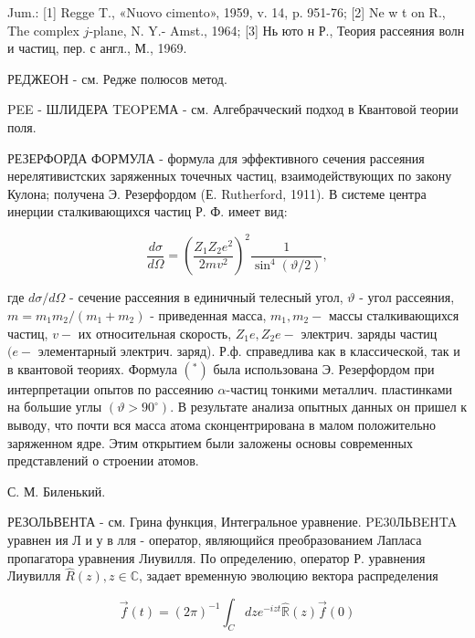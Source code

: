\documentclass[10pt]{article}
\begin{document}
Jum.: [1] Regge T., «Nuovo cimento», 1959, v. 14, p. 951-76; [2] Ne w t on R., The complex $j$-plane, N. Y.- Amst., 1964; [3] Нь юто н Р., Теория рассеяния волн и частиц, пер. с англ., М., 1969.



РЕДЖЕОН - см. Редже полюсов метод.



PEE - ШЛИДЕРА TEOPEМА - см. Алгебрачческий подход в Квантовой теории поля.



РЕЗЕРФОРДА ФОРМУЛА - формула для эффективного сечения рассеяния нерелятивистских заряженных точечных частиц, взаимодействующих по закону Кулона; получена Э. Резерфордом (Е. Rutherford, 1911). В системе центра инерции сталкивающихся частиц Р. Ф. имеет вид:



\[

\frac{d \sigma}{d \Omega}=\left(\frac{Z_{1} Z_{2} e^{2}}{2 m v^{2}}\right)^{2} \frac{1}{\sin ^{4}(\vartheta / 2)},

\]



где $d \sigma / d \Omega$ - сечение рассеяния в единичный телесный угол, $\vartheta$ - угол рассеяния, $m=m_{1} m_{2} /\left(m_{1}+m_{2}\right)$ - приведенная масса, $m_{1}, m_{2}-$ массы сталкивающихся частиц, $v-$ их относительная скорость, $Z_{1} e, Z_{2} e-$ электрич. заряды частиц $(e-$ элементарный электрич. заряд). Р.ф. справедлива как в классической, так и в квантовой теориях. Формула $\left({ }^{*}\right)$ была использована Э. Резерфордом при интерпретации опытов по рассеянию $\alpha$-частиц тонкими металлич. пластинками на большие углы $\left(\vartheta>90^{\circ}\right)$. В результате анализа опытных данных он пришел к выводу, что почти вся масса атома сконцентрирована в малом положительно заряженном ядре. Этим открытием были заложены основы современных представлений о строении атомов.



С. М. Биленький.



РЕЗОЛЬВЕНТА - см. Грина функция, Интегральное уравнение. PE30ЛЬBEHTA уравнен ия Л и у в лля - оператор, являющийся преобразованием Лапласа пропагатора уравнения Лиувилля. По определению, оператор Р. уравнения Лиувилля $\hat{R}(z), z \in \mathbb{C}$, задает временную эволюцию вектора распределения



\[

\vec{f}(t)=(2 \pi)^{-1} \int_{C} d z e^{-i z t} \hat{\mathbb{R}}(z) \vec{f}(0)

\]
\end{document}

